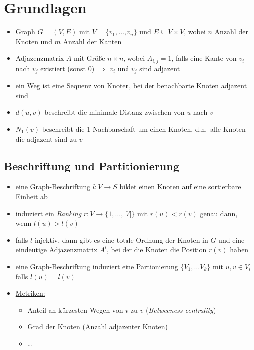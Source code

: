 \section{Grundlagen}

\begin{itemize}
  \item Graph $G = (V, E)$ mit $V = \lbrace v_1, \ldots, v_n \rbrace$ und $E \subseteq V \times V$, wobei $n$ Anzahl der Knoten und $m$ Anzahl der Kanten
  \item Adjazenzmatrix $A$ mit Größe $n \times n$, wobei $A_{i,j} = 1$, falls eine Kante von $v_i$ nach $v_j$ existiert (sonst $0$) $\Rightarrow$ $v_i$ und $v_j$ sind adjazent
  \item ein Weg ist eine Sequenz von Knoten, bei der benachbarte Knoten adjazent sind
  \item $d(u,v)$ beschreibt die minimale Distanz zwischen von $u$ nach $v$
  \item $N_1(v)$ beschreibt die 1-Nachbarschaft um einen Knoten, d.h.\ alle Knoten die adjazent sind zu $v$
\end{itemize}

\subsection{Beschriftung und Partitionierung}

\begin{itemize}
  \item eine Graph-Beschriftung $l: V \rightarrow S$ bildet einen Knoten auf eine sortierbare Einheit ab
  \item induziert ein \emph{Ranking} $r: V \rightarrow \lbrace 1, \ldots, |V| \rbrace$ mit $r(u) < r(v)$ genau dann, wenn $l(u) > l(v)$
  \item falls $l$ injektiv, dann gibt es eine totale Ordnung der Knoten in $G$ und eine eindeutige Adjazenzmatrix $A^l$, bei der die Knoten die Position $r(v)$ haben
  \item eine Graph-Beschriftung induziert eine Partionierung $\lbrace V_1, \ldots V_k \rbrace$ mit $u, v \in V_i$ falls $l(u) = l(v)$
  \item \underline{Metriken:}
    \begin{itemize}
      \item Anteil an kürzesten Wegen von $v$ zu $v$ (\emph{Betweeness centrality})
      \item Grad der Knoten (Anzahl adjazenter Knoten)
      \item \ldots
    \end{itemize}
\end{itemize}

